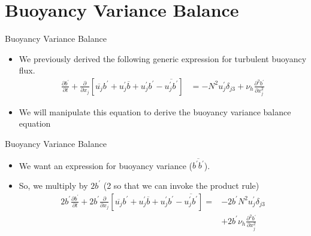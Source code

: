 \section{Buoyancy Variance Balance}     %
\begin{frame}{Buoyancy Variance Balance}
\begin{itemize}
  	\item We previously derived the following generic expression for turbulent buoyancy flux.
  	\begin{align*}
  	\frac{\partial b^\prime}{\partial t} + \frac{\partial}{\partial x_j}\left[\overline{u_j}b^\prime + u_j^\prime \overline{b} + u_j^\prime b^\prime - \overline{u_j^\prime b^\prime}\right] &= -N^2 u_j^\prime \delta_{j3} + \nu_h \frac{\partial^2 b^\prime}{\partial x_j^2}
  	\end{align*}
  	\item We will manipulate this equation to derive the buoyancy variance balance equation
  \end{itemize}
\end{frame}
\begin{frame}{Buoyancy Variance Balance}
\begin{itemize}
  	\item We want an expression for buoyancy variance ($\overline{b^\prime b^\prime}$).
  	\item So, we multiply by $2b^\prime$ (2 so that we can invoke the product rule)
  	\begin{align*}
  	2b^\prime\frac{\partial b^\prime}{\partial t} + 2b^\prime\frac{\partial}{\partial x_j}\left[\overline{u_j}b^\prime + u_j^\prime \overline{b} + u_j^\prime b^\prime - \overline{u_j^\prime b^\prime}\right] = &-2b^\prime N^2 u_j^\prime \delta_{j3} \\&+ 2b^\prime\nu_h \frac{\partial^2 b^\prime}{\partial x_j^2}
  	\end{align*}
  \end{itemize}
\end{frame}
